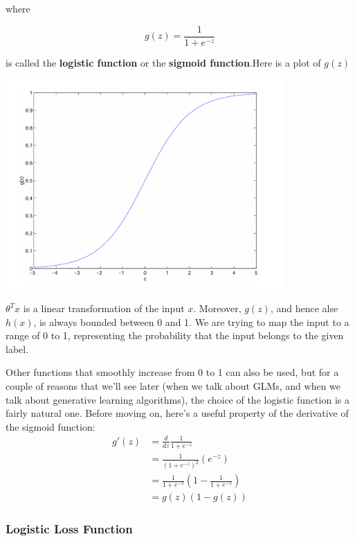 \documentclass[fontset=windows,pass]{article}
\numberwithin{equation}{subsection} %
\begin{document}
where

\begin{equation*}
	g(z) = \frac{1}{1+e^{-z}}
\end{equation*}

is called the \textbf{logistic function} or the \textbf{sigmoid function}.Here is a plot of $g(z)$
\begin{center}
	\includegraphics[width = 0.8\textwidth]{Figures/Sigmoid.png}
\end{center}

$\theta^{T}x$ is a linear transformation of the input $x$. Moreover, $g(z)$, and hence alse $h(x)$, 
is always bounded between 0 and 1. We are trying to map the input to a range of 0 to 1, representing 
the probability that the input belongs to the given label.

Other functions that smoothly increase from 0 to 1 can also be used, but for a couple of reasons that we'll see later 
(when we talk about GLMs, and when we talk about generative learning algorithms), the choice of the logistic function is a fairly natural one. 
Before moving on, here's a useful property of the derivative of the sigmoid function:
\begin{align*}
	g'(z) & = \frac{d}{dz} \frac{1}{1+e^{-z}}\\
	      & = \frac{1}{(1+e^{-z})^2} (e^{-z})\\
		  & = \frac{1}{1+e^{-z}} \left(1-\frac{1}{1+e^{-z}}\right)\\
		  & = g(z)\left(1-g(z)\right)
\end{align*}

\subsubsection{Logistic Loss Function}
\end{document}
